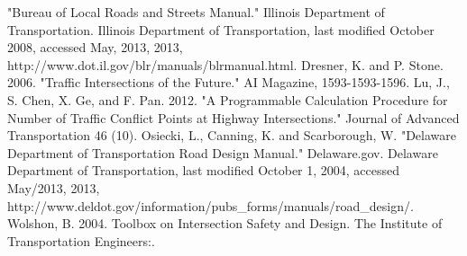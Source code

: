 \documentclass[10pt]{article}
\begin{document}
\begin{thebibliography}{100}
 "Bureau of Local Roads and Streets Manual." Illinois Department of Transportation. Illinois Department of Transportation, last modified October 2008, accessed May, 2013, 2013, http://www.dot.il.gov/blr/manuals/blrmanual.html.
 Dresner, K. and P. Stone. 2006. "Traffic Intersections of the Future." AI Magazine, 1593-1593-1596.
 Lu, J., S. Chen, X. Ge, and F. Pan. 2012. "A Programmable Calculation Procedure for Number of Traffic Conflict Points at Highway Intersections." Journal of Advanced Transportation 46 (10).
 Osiecki, L., Canning, K. and Scarborough, W. "Delaware Department of Transportation Road Design Manual." Delaware.gov. Delaware Department of Transportation, last modified October 1, 2004, accessed May/2013, 2013, http://www.deldot.gov/information/pubs_forms/manuals/road_design/.
 Wolshon, B. 2004. Toolbox on Intersection Safety and Design. The Institute of Transportation Engineers:.
\end{thebibliography}
\end{document}
